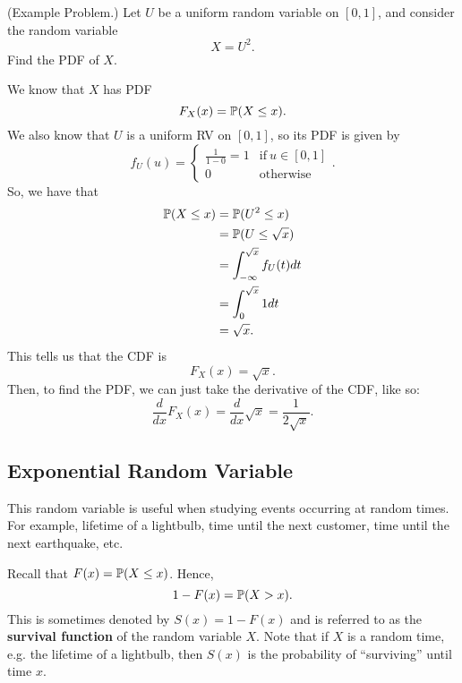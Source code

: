 \begin{mdframed}[]
    (Example Problem.) Let $U$ be a uniform random variable on $[0, 1]$, and consider the random variable 
    \[X = U^2.\]
    Find the PDF of $X$. 

    \begin{mdframed}[]
        We know that $X$ has PDF 
        \[F_{X}(x) = \mathbb{P}(X \leq x).\]
        We also know that $U$ is a uniform RV on $[0, 1]$, so its PDF is given by 
        \[f_{U}(u) = \begin{cases}
            \frac{1}{1 - 0} = 1 & \text{if} \ u \in [0, 1] \\ 
            0 & \text{otherwise}
        \end{cases}.\]
        So, we have that 
        \begin{equation*}
            \begin{aligned}
                \mathbb{P}(X \leq x) &= \mathbb{P}(U^2 \leq x) \\ 
                    &= \mathbb{P}(U \leq \sqrt{x}) \\ 
                    &= \int_{-\infty}^{\sqrt{x}} f_{U}(t) dt \\ 
                    &= \int_{0}^{\sqrt{x}} 1 dt \\ 
                    &= \sqrt{x}.
            \end{aligned}
        \end{equation*}
        This tells us that the CDF is 
        \[F_{X}(x) = \sqrt{x}.\]
        Then, to find the PDF, we can just take the derivative of the CDF, like so: 
        \[\frac{d}{dx} F_{X}(x) = \frac{d}{dx} \sqrt{x} = \frac{1}{2\sqrt{x}}.\]
    \end{mdframed}
\end{mdframed}

\subsection{Exponential Random Variable}
This random variable is useful when studying events occurring at random times. For example, lifetime of a lightbulb, time until the next customer, time until the next earthquake, etc. 

\bigskip 

Recall that $F(x) = \mathbb{P}(X \leq x)$. Hence,
\[1 - F(x) = \mathbb{P}(X > x).\]
This is sometimes denoted by $S(x) = 1 - F(x)$ and is referred to as the \textbf{survival function} of the random variable $X$. Note that if $X$ is a random time, e.g. the lifetime of a lightbulb, then $S(x)$ is the probability of ``surviving'' until time $x$. 

